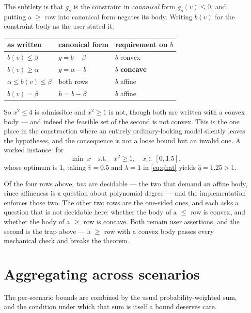 \documentclass[11pt]{article}
\theoremstyle{plain}
\theoremstyle{remark}
\newcommand{\vhat}{\hat{v}}
\newcommand{\qhat}{\hat{q}}
\begin{document}
The subtlety is that $g_s$ is the constraint in \emph{canonical} form
$g_s(v) \le 0$, and putting a $\ge$ row into canonical form negates its body.
Writing $b(v)$ for the constraint body as the user stated it:

\begin{center}
\begin{tabular}{lll}
\toprule
as written & canonical form & requirement on $b$ \\
\midrule
$b(v) \le \beta$              & $g = b - \beta$              & $b$ convex \\
$b(v) \ge \alpha$             & $g = \alpha - b$             & $b$ \textbf{concave} \\
$\alpha \le b(v) \le \beta$   & both rows                    & $b$ affine \\
$b(v) = \beta$                & $h = b - \beta$              & $b$ affine \\
\bottomrule
\end{tabular}
\end{center}

So $x^2 \le 4$ is admissible and $x^2 \ge 1$ is not, though both are written with
a convex body --- and indeed the feasible set of the second is not convex.  This
is the one place in the construction where an entirely ordinary-looking model
silently leaves the hypotheses, and the consequence is not a loose bound but an
invalid one.  A worked instance: for
\[
  \min\; x \quad \text{s.t.} \quad x^2 \ge 1, \quad x \in [0, 1.5],
\]
whose optimum is $1$, taking $\vhat = 0.5$ and $\lambda = 1$ in \eqref{eq:qhat}
yields $\qhat = 1.25 > 1$.

Of the four rows above, \emph{two} are decidable --- the two that demand an
affine body, since affineness is a question about polynomial degree --- and the
implementation enforces those two.  The other two rows are the one-sided ones,
and each asks a question that is not decidable here: whether the body of a
$\le$ row is convex, and whether the body of a $\ge$ row is concave.  Both
remain user assertions, and the second is the trap above --- a $\ge$ row with a
convex body passes every mechanical check and breaks the theorem.

\section{Aggregating across scenarios}

The per-scenario bounds are combined by the usual probability-weighted sum, and
the condition under which that sum is itself a bound deserves care.
\end{document}
